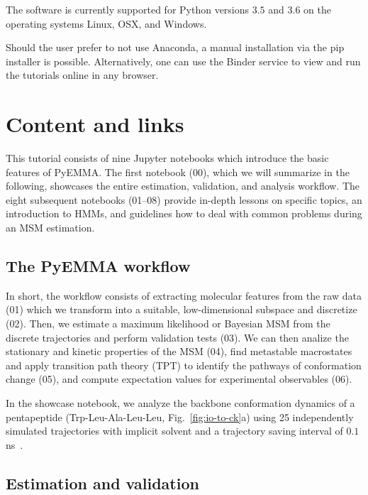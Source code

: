 \documentclass[9pt,tutorial]{livecoms}
\begin{document}
The software is currently supported for Python versions $3.5$ and $3.6$ on the operating systems Linux, OSX, and Windows.

Should the user prefer to not use Anaconda, a manual installation via the pip installer is possible. Alternatively, one can use the Binder service to view and run the tutorials online in any browser.

\section{Content and links}

This tutorial consists of nine Jupyter notebooks which introduce the basic features of PyEMMA. The first notebook (00), which we will summarize in the following, showcases the entire estimation, validation, and analysis workflow. The eight subsequent notebooks (01--08) provide in-depth lessons on specific topics, an introduction to HMMs, and guidelines how to deal with common problems during an MSM estimation.

\subsection{The PyEMMA workflow}

In short, the workflow consists of extracting molecular features from the raw data (01) which we transform into a suitable, low-dimensional subspace and discretize (02). Then, we estimate a maximum likelihood or Bayesian MSM from the discrete trajectories and perform validation tests (03). We can then analize the stationary and kinetic properties of the MSM (04), find metastable macrostates and apply transition path theory (TPT) to identify the pathways of conformation change (05), and compute expectation values for experimental observables (06).

In the showcase notebook, we analyze the backbone conformation dynamics of a pentapeptide (Trp-Leu-Ala-Leu-Leu, Fig.~\ref{fig:io-to-ck}a) using 25 independently simulated trajectories with implicit solvent and a trajectory saving interval of $0.1$ ns~\cite{pyemma}.

\subsection{Estimation and validation}
\end{document}

